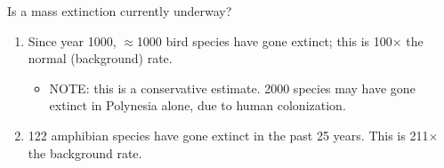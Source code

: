 \begin{frame}[t]
    \begin{adjustwidth}{-2em}{-1.5em}
        Is a mass extinction currently underway?


        \begin{enumerate}
            \item<3-> Since year 1000, $\approx$1000 bird species have gone
                extinct; this is 100$\times$ the normal (background) rate.

            \begin{itemize}
                \item NOTE: this is a conservative estimate. 2000 species may
                    have gone extinct in Polynesia alone, due to human
                    colonization.
            \end{itemize}

            \vspace{8mm}
            \item<4-> 122 amphibian species have gone extinct in the past 25
                years.  This is 211$\times$ the background rate.
        \end{enumerate}
    \end{adjustwidth}
\end{frame}

